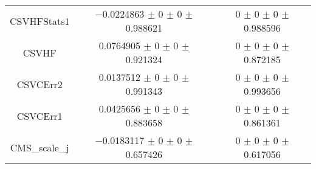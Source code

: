 \begin{table}
\begin{tabular}{ccc}
CSVHFStats1 & \num{-0.0224863} $\pm$ \num{0} $\pm$ \num{0} $\pm$ \num{0.988621} & \num{0} $\pm$ \num{0} $\pm$ \num{0} $\pm$ \num{0.988596}\\
CSVHF & \num{0.0764905} $\pm$ \num{0} $\pm$ \num{0} $\pm$ \num{0.921324} & \num{0} $\pm$ \num{0} $\pm$ \num{0} $\pm$ \num{0.872185}\\
CSVCErr2 & \num{0.0137512} $\pm$ \num{0} $\pm$ \num{0} $\pm$ \num{0.991343} & \num{0} $\pm$ \num{0} $\pm$ \num{0} $\pm$ \num{0.993656}\\
CSVCErr1 & \num{0.0425656} $\pm$ \num{0} $\pm$ \num{0} $\pm$ \num{0.883658} & \num{0} $\pm$ \num{0} $\pm$ \num{0} $\pm$ \num{0.861361}\\
CMS\_scale\_j & \num{-0.0183117} $\pm$ \num{0} $\pm$ \num{0} $\pm$ \num{0.657426} & \num{0} $\pm$ \num{0} $\pm$ \num{0} $\pm$ \num{0.617056}\\
\bottomrule
\end{tabular}
\end{table}